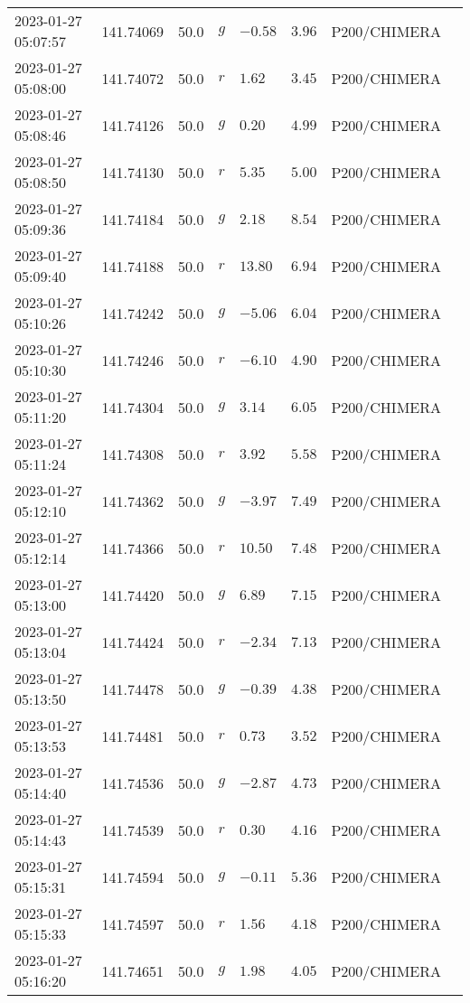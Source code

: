 \documentclass{nature_plusfigure}
\begin{document}
\begin{supplement}
\begin{center}
\begin{longtable}{llllllll}
2023-01-27 05:07:57 & 141.74069 & 50.0 & $g$ & $-0.58$ & $3.96$ & P200/CHIMERA &  \\ 
2023-01-27 05:08:00 & 141.74072 & 50.0 & $r$ & $1.62$ & $3.45$ & P200/CHIMERA &  \\ 
2023-01-27 05:08:46 & 141.74126 & 50.0 & $g$ & $0.20$ & $4.99$ & P200/CHIMERA &  \\ 
2023-01-27 05:08:50 & 141.74130 & 50.0 & $r$ & $5.35$ & $5.00$ & P200/CHIMERA &  \\ 
2023-01-27 05:09:36 & 141.74184 & 50.0 & $g$ & $2.18$ & $8.54$ & P200/CHIMERA &  \\ 
2023-01-27 05:09:40 & 141.74188 & 50.0 & $r$ & $13.80$ & $6.94$ & P200/CHIMERA &  \\ 
2023-01-27 05:10:26 & 141.74242 & 50.0 & $g$ & $-5.06$ & $6.04$ & P200/CHIMERA &  \\ 
2023-01-27 05:10:30 & 141.74246 & 50.0 & $r$ & $-6.10$ & $4.90$ & P200/CHIMERA &  \\ 
2023-01-27 05:11:20 & 141.74304 & 50.0 & $g$ & $3.14$ & $6.05$ & P200/CHIMERA &  \\ 
2023-01-27 05:11:24 & 141.74308 & 50.0 & $r$ & $3.92$ & $5.58$ & P200/CHIMERA &  \\ 
2023-01-27 05:12:10 & 141.74362 & 50.0 & $g$ & $-3.97$ & $7.49$ & P200/CHIMERA &  \\ 
2023-01-27 05:12:14 & 141.74366 & 50.0 & $r$ & $10.50$ & $7.48$ & P200/CHIMERA &  \\ 
2023-01-27 05:13:00 & 141.74420 & 50.0 & $g$ & $6.89$ & $7.15$ & P200/CHIMERA &  \\ 
2023-01-27 05:13:04 & 141.74424 & 50.0 & $r$ & $-2.34$ & $7.13$ & P200/CHIMERA &  \\ 
2023-01-27 05:13:50 & 141.74478 & 50.0 & $g$ & $-0.39$ & $4.38$ & P200/CHIMERA &  \\ 
2023-01-27 05:13:53 & 141.74481 & 50.0 & $r$ & $0.73$ & $3.52$ & P200/CHIMERA &  \\ 
2023-01-27 05:14:40 & 141.74536 & 50.0 & $g$ & $-2.87$ & $4.73$ & P200/CHIMERA &  \\ 
2023-01-27 05:14:43 & 141.74539 & 50.0 & $r$ & $0.30$ & $4.16$ & P200/CHIMERA &  \\ 
2023-01-27 05:15:31 & 141.74594 & 50.0 & $g$ & $-0.11$ & $5.36$ & P200/CHIMERA &  \\ 
2023-01-27 05:15:33 & 141.74597 & 50.0 & $r$ & $1.56$ & $4.18$ & P200/CHIMERA &  \\ 
2023-01-27 05:16:20 & 141.74651 & 50.0 & $g$ & $1.98$ & $4.05$ & P200/CHIMERA &  \\ 

\end{longtable}
\end{center}
\end{supplement}
\end{document}
